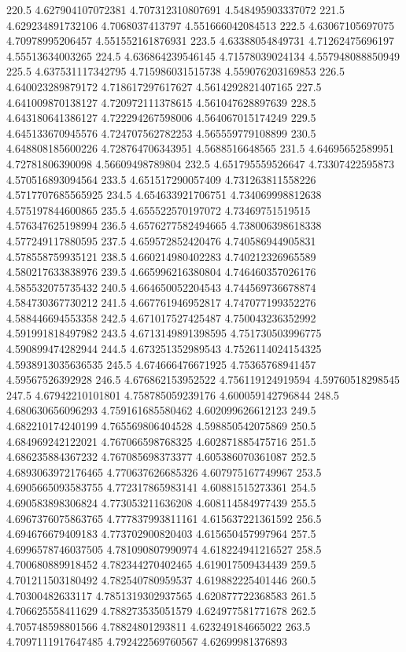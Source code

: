 220.5 4.627904107072381 4.707312310807691 4.548495903337072
221.5 4.629234891732106 4.7068037413797 4.551666042084513
222.5 4.63067105697075 4.70978995206457 4.551552161876931
223.5 4.63388054849731 4.71262475696197 4.55513634003265
224.5 4.636864239546145 4.71578039024134 4.557948088850949
225.5 4.637531117342795 4.715986031515738 4.559076203169853
226.5 4.640023289879172 4.718617297617627 4.5614292821407165
227.5 4.641009870138127 4.720972111378615 4.561047628897639
228.5 4.643180641386127 4.722294267598006 4.564067015174249
229.5 4.645133670945576 4.724707562782253 4.565559779108899
230.5 4.648808185600226 4.728764706343951 4.5688516648565
231.5 4.64695652589951 4.72781806390098 4.56609498789804
232.5 4.651795559526647 4.73307422595873 4.570516893094564
233.5 4.651517290057409 4.731263811558226 4.5717707685565925
234.5 4.654633921706751 4.734069998812638 4.575197844600865
235.5 4.655522570197072 4.73469751519515 4.576347625198994
236.5 4.6576277582494665 4.738006398618338 4.577249117880595
237.5 4.659572852420476 4.740586944905831 4.578558759935121
238.5 4.660214980402283 4.740212326965589 4.580217633838976
239.5 4.665996216380804 4.746460357026176 4.585532075735432
240.5 4.664650052204543 4.744569736678874 4.584730367730212
241.5 4.667761946952817 4.747077199352276 4.588446694553358
242.5 4.671017527425487 4.750043236352992 4.591991818497982
243.5 4.6713149891398595 4.751730503996775 4.590899474282944
244.5 4.673251352989543 4.7526114024154325 4.5938913035636535
245.5 4.674666476671925 4.75365768941457 4.59567526392928
246.5 4.676862153952522 4.756119124919594 4.59760518298545
247.5 4.67942210101801 4.758785059239176 4.600059142796844
248.5 4.680630656096293 4.759161685580462 4.602099626612123
249.5 4.682210174240199 4.765569806404528 4.598850542075869
250.5 4.684969242122021 4.767066598768325 4.602871885475716
251.5 4.686235884367232 4.767085698373377 4.605386070361087
252.5 4.6893063972176465 4.770637626685326 4.607975167749967
253.5 4.6905665093583755 4.772317865983141 4.60881515273361
254.5 4.690583898306824 4.773053211636208 4.608114584977439
255.5 4.6967376075863765 4.777837993811161 4.615637221361592
256.5 4.694676679409183 4.773702900820403 4.615650457997964
257.5 4.6996578746037505 4.781090807990974 4.618224941216527
258.5 4.700680889918452 4.782344270402465 4.619017509434439
259.5 4.701211503180492 4.782540780959537 4.619882225401446
260.5 4.70300482633117 4.7851319302937565 4.620877722368583
261.5 4.706625558411629 4.788273535051579 4.624977581771678
262.5 4.705748598801566 4.78824801293811 4.623249184665022
263.5 4.7097111917647485 4.792422569760567 4.62699981376893
